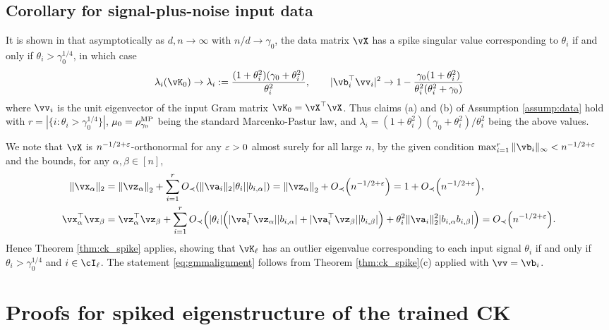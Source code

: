 \subsection{Corollary for signal-plus-noise input data}\label{subsec:GMM_proof}

\begin{proof-of-coro}[\ref{cor:gmm}]
It is shown in \cite[Section 3.1]{benaych2012singular} that asymptotically as
$d,n \to \infty$ with $n/d \to \gamma_0$, the data matrix $\vX$ has a spike
singular value corresponding to $\theta_i$ if and only if
$\theta_i>\gamma_0^{1/4}$, in which case
\[\lambda_i(\vK_0) \to
\lambda_i:=\frac{(1+\theta_i^2)(\gamma_0+\theta_i^2)}{\theta_i^2},
\qquad |\vb_i^\top \vv_i|^2 \to
1-\frac{\gamma_0(1+\theta_i^2)}{\theta_i^2(\theta_i^2+\gamma_0)}\]
where $\vv_i$ is the unit eigenvector of the input Gram matrix
$\vK_0=\vX^\top\vX$. Thus claims (a) and (b) of Assumption \ref{assump:data}
hold with $r=|\{i:\theta_i>\gamma_0^{1/4}\}|$,
$\mu_0=\rho_{\gamma_0}^{\textnormal{MP}}$ being the standard Marcenko-Pastur law, and
$\lambda_i=(1+\theta_i^2)(\gamma_0+\theta_i^2)/\theta_i^2$
being the above values.

We note that $\vX$ is $n^{-1/2+\varepsilon}$-orthonormal for any $\varepsilon>0$
almost surely for all large $n$, by the given condition
$\max_{i=1}^r \|\vb_i\|_\infty<n^{-1/2+\eps}$ and the bounds, for any
$\alpha,\beta \in [n]$,
\begin{align*}
\|\vx_\alpha\|_2&=\left\|\vz_\alpha\right\|_2
+\sum_{i=1}^r \SD{\|\va_i\|_2 |\theta_i| |b_{i,\alpha}|}
=\left\|\vz_\alpha\right\|_2+\SD{n^{-1/2+\eps}}=1+\SD{n^{-1/2+\eps}},\\
\vx_\alpha^\top \vx_\beta&=\vz_\alpha^\top \vz_\beta
+\sum_{i=1}^r \SD{|\theta_i| \Big(
|\va_i^\top \vz_\alpha| |b_{i,\alpha}|
+|\va_i^\top \vz_\beta| |b_{i,\beta}|\Big)
+\theta_i^2 \|\va_i\|_2^2 |b_{i,\alpha}b_{i,\beta}|}
=\SD{n^{-1/2+\eps}}.
\end{align*}
Hence Theorem \ref{thm:ck_spike} applies, showing
that $\vK_\ell$ has an outlier eigenvalue corresponding to each input
signal $\theta_i$ if and only if $\theta_i>\gamma_0^{1/4}$ and
$i \in \cI_\ell$. The statement \eqref{eq:gmmalignment} follows from 
Theorem \ref{thm:ck_spike}(c) applied with $\vv=\vb_i$.
\end{proof-of-coro}

\section{Proofs for spiked eigenstructure of the trained CK}\label{sec:trained_CK_proof}

